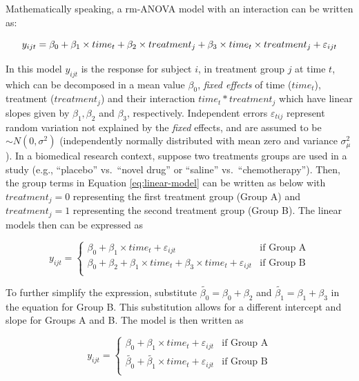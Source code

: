 \documentclass[
]{article}
\begin{document}
Mathematically speaking, a rm-ANOVA model with an interaction can be written as:

\begin{equation}
y_{ijt} = \beta_0+\beta_1 \times time_{t} +\beta_2 \times treatment_{j} +\beta_3 \times time_{t}\times treatment_{j}+\varepsilon_{ijt}\\ 
\label{eq:linear-model}
\end{equation}

In this model \(y_{ijt}\) is the response for subject \(i\), in treatment group \(j\) at time \(t\), which can be decomposed in a mean value \(\beta_0\), \emph{fixed effects} of time (\(time_t\)), treatment (\(treatment_j\)) and their interaction \(time_t*treatment_j\) which have linear slopes given by \(\beta_1, \beta_2\) and \(\beta_3\), respectively. Independent errors \(\varepsilon_{tij}\) represent random variation not explained by the \emph{fixed} effects, and are assumed to be \(\sim N(0,\sigma^2)\) (independently normally distributed with mean zero and variance \(\sigma^2_\mu\)).
In a biomedical research context, suppose two treatments groups are used in a study (e.g., ``placebo'' vs.~``novel drug'' or ``saline'' vs.~``chemotherapy''). Then, the group terms in Equation \eqref{eq:linear-model} can be written as below with \(treatment_j=0\) representing the first treatment group (Group A) and \(treatment_j=1\) representing the second treatment group (Group B). The linear models then can be expressed as

\begin{equation}
y_{ijt} = \begin{cases}
\beta_0 + \beta_1\times time_{t}+\varepsilon_{ijt}   & \mbox{if Group A}\\
\beta_0 + \beta_2+\beta_1 \times time_{t} +\beta_3 \times time_{t}+\varepsilon_{ijt}  & \mbox{if Group B}\\
\end{cases}
\label{eq:ANOVA-by-group}
\end{equation}

To further simplify the expression, substitute \(\widetilde{\beta_{0}}=\beta_0+\beta_{2}\) and \(\widetilde{\beta_{1}}=\beta_{1}+\beta_{3}\) in the equation for Group B. This substitution allows for a different intercept and slope for Groups A and B. The model is then written as

\begin{equation}
y_{ijt} = \begin{cases}
\beta_0 + \beta_1\times time_{t}+\varepsilon_{ijt}   & \mbox{if Group A}\\
\widetilde{\beta_{0}} + \widetilde{\beta_1} \times time_{t}+\varepsilon_{ijt}  & \mbox{if Group B}\\
\end{cases}
\label{eq:ANOVA-lines}
\end{equation}
\end{document}
